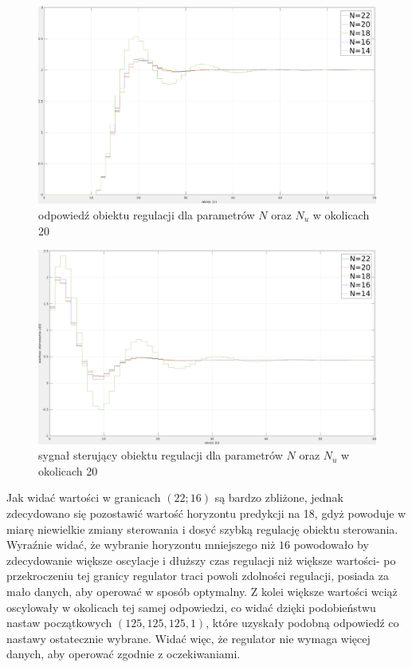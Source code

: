 \documentclass[fleqn]{article}
\begin{document}
\begin{figure}[H]
	\includegraphics[width=\textwidth]{scripts/zadanie5bwyjscie.png}
	\caption{odpowiedź obiektu regulacji dla parametrów $N$ oraz $N_u$ w okolicach 20}
\end{figure}
\begin{figure}[H]
	\includegraphics[width=\textwidth]{scripts/zadanie5bster.png}
	\caption{sygnał sterujący obiektu regulacji dla parametrów $N$ oraz $N_u$ w okolicach 20}
\end{figure}

Jak widać wartości w granicach $(22;16)$ są bardzo zbliżone, jednak zdecydowano się pozostawić wartość horyzontu predykcji na 18, gdyż powoduje w miarę niewielkie zmiany sterowania i dosyć szybką regulację obiektu sterowania. Wyraźnie widać, że wybranie horyzontu mniejszego niż $16$ powodowało by zdecydowanie większe oscylacje i dłuższy czas regulacji niż większe wartości- po przekroczeniu tej granicy regulator traci powoli zdolności regulacji, posiada za mało danych, aby operować w sposób optymalny. Z kolei większe wartości wciąż oscylowały w okolicach tej samej odpowiedzi, co widać dzięki podobieństwu nastaw początkowych $(125, 125, 125, 1)$, które uzyskały podobną odpowiedź co nastawy ostatecznie wybrane. Widać więc, że regulator nie wymaga więcej danych, aby operować zgodnie z oczekiwaniami.
\end{document}
